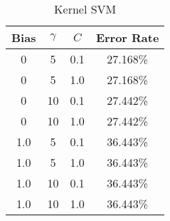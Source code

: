 \begin{center}
\begin{longtable}{|c|c|c|c|}
\caption{Kernel SVM}\label{tab:svm_rbf_acctable}\\
\hline
Bias & $\gamma$ & $C$ & Error Rate \\
\hline
0 & 5 & 0.1 & 27.168\% \\
\hline
0 & 5 & 1.0 & 27.168\% \\
\hline
0 & 10 & 0.1 & 27.442\% \\
\hline
0 & 10 & 1.0 & 27.442\% \\
\hline
1.0 & 5 & 0.1 & 36.443\% \\
\hline
1.0 & 5 & 1.0 & 36.443\% \\
\hline
1.0 & 10 & 0.1 & 36.443\% \\
\hline
1.0 & 10 & 1.0 & 36.443\% \\
\hline
\hline
\end{longtable}
\end{center}
